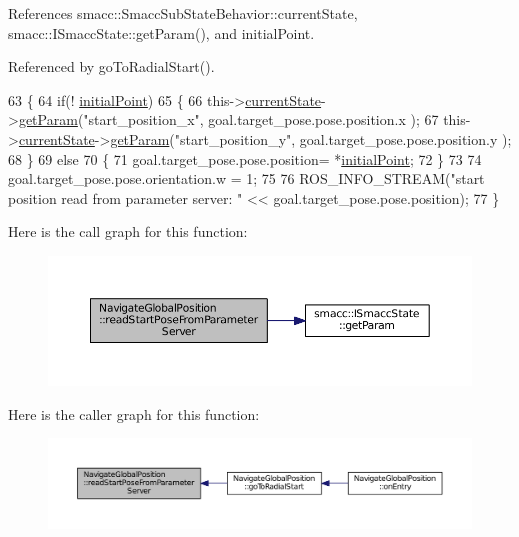References smacc\+::\+Smacc\+Sub\+State\+Behavior\+::current\+State, smacc\+::\+I\+Smacc\+State\+::get\+Param(), and initial\+Point.



Referenced by go\+To\+Radial\+Start().


\begin{DoxyCode}
63   \{
64     \textcolor{keywordflow}{if}(! \hyperlink{classNavigateGlobalPosition_a3b8beafc64a18063c86228b6c497102b}{initialPoint})
65     \{
66       this->\hyperlink{classsmacc_1_1SmaccSubStateBehavior_a62e2b9da4a446f09396d0b4c01659b88}{currentState}->\hyperlink{classsmacc_1_1ISmaccState_abbb3a24b912c6e8de28f7b86123b6357}{getParam}(\textcolor{stringliteral}{"start\_position\_x"}, goal.target\_pose.pose.position.x
      );
67       this->\hyperlink{classsmacc_1_1SmaccSubStateBehavior_a62e2b9da4a446f09396d0b4c01659b88}{currentState}->\hyperlink{classsmacc_1_1ISmaccState_abbb3a24b912c6e8de28f7b86123b6357}{getParam}(\textcolor{stringliteral}{"start\_position\_y"}, goal.target\_pose.pose.position.y
      );
68     \}
69     \textcolor{keywordflow}{else}
70     \{
71       goal.target\_pose.pose.position= *\hyperlink{classNavigateGlobalPosition_a3b8beafc64a18063c86228b6c497102b}{initialPoint};
72     \}
73     
74     goal.target\_pose.pose.orientation.w = 1;
75 
76     ROS\_INFO\_STREAM(\textcolor{stringliteral}{"start position read from parameter server: "} << goal.target\_pose.pose.position);
77   \}
\end{DoxyCode}


Here is the call graph for this function\+:
\nopagebreak
\begin{figure}[H]
\begin{center}
\leavevmode
\includegraphics[width=350pt]{classNavigateGlobalPosition_a7f59ee188413d4f4b006549ba6d3d3f8_cgraph}
\end{center}
\end{figure}




Here is the caller graph for this function\+:
\nopagebreak
\begin{figure}[H]
\begin{center}
\leavevmode
\includegraphics[width=350pt]{classNavigateGlobalPosition_a7f59ee188413d4f4b006549ba6d3d3f8_icgraph}
\end{center}
\end{figure}




